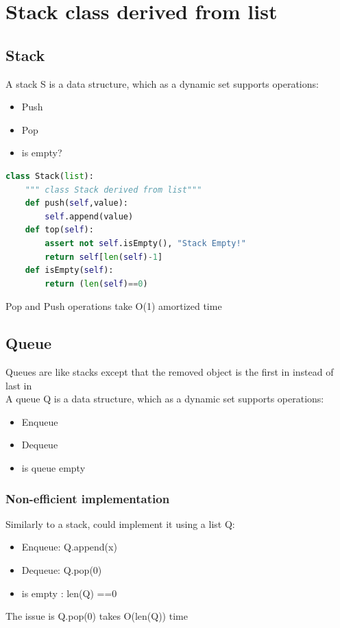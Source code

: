 \documentclass[12pt,oneside]{book}
\begin{document}
\chapter{Stack class derived from list}
\section{Stack}
A stack S is a data structure, which as a dynamic set supports operations:
\begin{itemize}
	\item Push
	\item Pop
	\item is empty?
\end{itemize}
{\small\begin{lstlisting}[language=python]
class Stack(list):
    """ class Stack derived from list"""
    def push(self,value):
        self.append(value)
    def top(self):
        assert not self.isEmpty(), "Stack Empty!"
        return self[len(self)-1]
    def isEmpty(self):
        return (len(self)==0)
            \end{lstlisting}}
Pop and Push operations take O(1) amortized time
\section{Queue}
Queues are like stacks except that the removed object is the first in instead of last in\\
A queue Q is a data structure, which as a dynamic set supports operations:
\begin{itemize}
	\item Enqueue
	\item Dequeue
	\item is queue empty
\end{itemize}
\pagebreak
\subsection{Non-efficient implementation}
Similarly to a stack, could implement it using a list Q:
\begin{itemize}
	\item Enqueue: Q.append(x)
	\item Dequeue: Q.pop(0)
	\item is empty : len(Q) ==0
\end{itemize}
The issue is Q.pop(0) takes O(len(Q)) time
\end{document}
